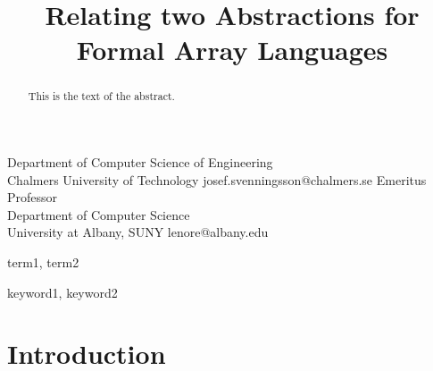 \documentclass{sigplanconf}
\begin{document}
\setlength{\pdfpageheight}{\paperheight}
\setlength{\pdfpagewidth}{\paperwidth}






\title{Relating two Abstractions for Formal Array Languages}

           {Department of Computer Science of Engineering\\Chalmers University of Technology}
           {josef.svenningsson@chalmers.se}
           {Emeritus Professor\\Department of Computer Science\\
University at Albany, SUNY}
           {lenore@albany.edu}

\maketitle

\begin{abstract}
This is the text of the abstract.
\end{abstract}


\terms
term1, term2

\keywords
keyword1, keyword2

\section{Introduction}
\end{document}
